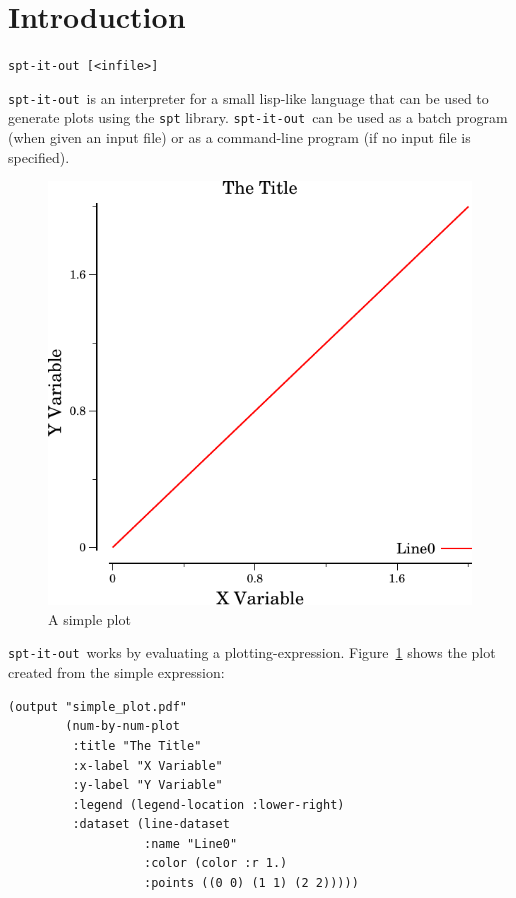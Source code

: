 \documentclass{article}
\title{\sio}
\author{Ethan Burns\\
{\tt burns.ethan at gmail.com}}
\date{\today}
\newcommand{\sio}{{\tt spt-it-out}}
\begin{document}
\maketitle

\section{\label{sect:intro} Introduction}
\begin{center}
{\tt spt-it-out [<infile>]}
\end{center}

\sio\ is an interpreter for a small lisp-like language that can be
used to generate plots using the {\tt spt} library.  \sio\ can be used
as a batch program (when given an input file) or as a command-line
program (if no input file is specified).

\begin{figure}[t]
\begin{center}
\includegraphics{simple_plot}
\caption{\label{fig:simp}A simple plot}
\end{center}
\end{figure}

\sio\ works by evaluating a plotting-expression.
Figure~\ref{fig:simp} shows the plot created from the simple
expression:

\begin{verbatim}
(output "simple_plot.pdf"
        (num-by-num-plot
         :title "The Title"
         :x-label "X Variable"
         :y-label "Y Variable"
         :legend (legend-location :lower-right)
         :dataset (line-dataset
                   :name "Line0"
                   :color (color :r 1.)
                   :points ((0 0) (1 1) (2 2)))))
\end{verbatim}
\end{document}
